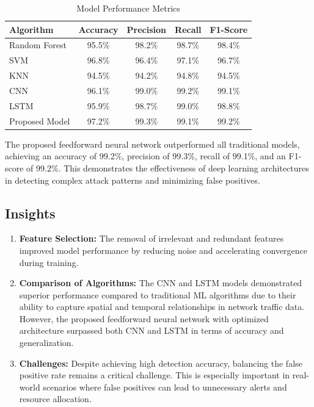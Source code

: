 \documentclass[conference]{IEEEtran}
\begin{document}
\begin{table}[ht]
\centering
\caption{Model Performance Metrics}
\label{tab:model_performance}
\begin{tabular}{|l|c|c|c|c|}
\hline
\textbf{Algorithm} & \textbf{Accuracy} & \textbf{Precision} & \textbf{Recall} & \textbf{F1-Score} \\ \hline
Random Forest & 95.5\% & 98.2\% & 98.7\% & 98.4\%\\ \hline
SVM & 96.8\% & 96.4\% & 97.1\% & 96.7\%\\ \hline
KNN & 94.5\% & 94.2\% & 94.8\% & 94.5\%\\ \hline
CNN & 96.1\% & 99.0\% & 99.2\% & 99.1\%\\ \hline
LSTM & 95.9\% & 98.7\% & 99.0\% & 98.8\%\\ \hline
Proposed Model & 97.2\% & 99.3\% & 99.1\% & 99.2\%\\ \hline
\end{tabular}
\end{table}

The proposed feedforward neural network outperformed all traditional models, achieving an accuracy of 99.2\%, precision of 99.3\%, recall of 99.1\%, and an F1-score of 99.2\%. This demonstrates the effectiveness of deep learning architectures in detecting complex attack patterns and minimizing false positives.

\subsection{Insights}
\begin{enumerate}[label=\roman*)]
    \item \textbf{Feature Selection:} The removal of irrelevant and redundant features improved model performance by reducing noise and accelerating convergence during training.
    \item \textbf{Comparison of Algorithms:} The CNN and LSTM models demonstrated superior performance compared to traditional ML algorithms due to their ability to capture spatial and temporal relationships in network traffic data. However, the proposed feedforward neural network with optimized architecture surpassed both CNN and LSTM in terms of accuracy and generalization.
    \item \textbf{Challenges:} Despite achieving high detection accuracy, balancing the false positive rate remains a critical challenge. This is especially important in real-world scenarios where false positives can lead to unnecessary alerts and resource allocation.
\end{enumerate}
\end{document}
